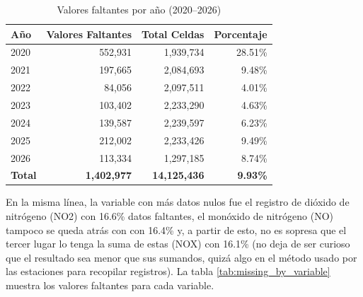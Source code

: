 \documentclass[11pt]{article}
\begin{document}
\begin{table}[htbp]
\centering
\caption{Valores faltantes por año (2020--2026)}
\label{tab:missing_by_year}
\begin{tabular}{lrrr}
\hline
\textbf{Año} & \textbf{Valores Faltantes} & \textbf{Total Celdas} & \textbf{Porcentaje} \\
\hline
2020 & 552,931 & 1,939,734 & 28.51\% \\
2021 & 197,665 & 2,084,693 & 9.48\% \\
2022 & 84,056 & 2,097,511 & 4.01\% \\
2023 & 103,402 & 2,233,290 & 4.63\% \\
2024 & 139,587 & 2,239,597 & 6.23\% \\
2025 & 212,002 & 2,233,426 & 9.49\% \\
2026 & 113,334 & 1,297,185 & 8.74\% \\
\hline
\textbf{Total} & \textbf{1,402,977} & \textbf{14,125,436} & \textbf{9.93\%} \\
\hline
\end{tabular}
\end{table}

En la misma línea, la variable con más datos nulos fue el registro de dióxido de nitrógeno (NO2) con 16.6\% datos faltantes, el monóxido de nitrógeno (NO) tampoco se queda atrás con con 16.4\% y, a partir de esto, no es sopresa que el tercer lugar lo tenga la suma de estas (NOX) con 16.1\% (no deja de ser curioso que el resultado sea menor que sus sumandos, quizá algo en el método usado por las estaciones para recopilar registros). La tabla \ref{tab:missing_by_variable} muestra los valores faltantes para cada variable.
\end{document}
